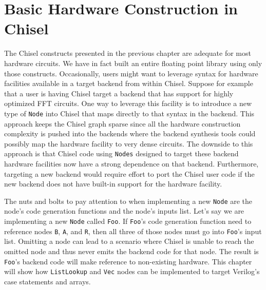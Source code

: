 \section{Basic Hardware Construction in Chisel}
\label{sec:basic}
The Chisel constructs presented in the previous chapter are adequate
for most hardware circuits. We have in fact built an entire floating
point library using only those constructs. Occasionally, users might
want to leverage syntax for hardware facilities available in a
target backend from within Chisel. Suppose for example that a user is
having Chisel target a backend that has support for highly optimized
FFT circuits. One way to leverage this facility is to introduce a new
type of {\tt Node} into Chisel that maps directly to that syntax in
the backend. This approach keeps the Chisel graph sparse since all the
hardware construction complexity is pushed into the backends where the
backend synthesis tools could possibly map the hardware facility to
very dense circuits. The downside to this approach is that Chisel code
using {\tt Nodes} designed to target these backend hardware facilities
now have a strong dependence on that backend. Furthermore, targeting a
new backend would require effort to port the Chisel user code if the
new backend does not have built-in support for the hardware facility.

The nuts and bolts to pay attention to when implementing a new 
{\tt Node} are the node's code generation functions and the node's
inputs list. Let's say we are implementing a new {\tt Node} called
{\tt Foo}. If {\tt Foo}'s code generation function need to reference
nodes {\tt B}, {\tt A}, and {\tt R}, then all three of those nodes
must go into {\tt Foo}'s input list. Omitting a node can lead to a
scenario where Chisel is unable to reach the omitted node and thus
never emits the backend code for that node. The result is 
{\tt Foo}'s backend code will make reference to non-existing hardware.
This chapter will show how {\tt ListLookup} and {\tt Vec} nodes can be
implemented to target Verilog's case statements and arrays.

